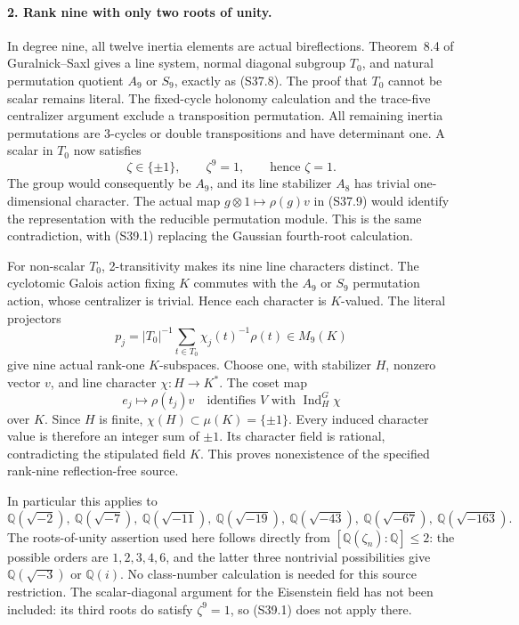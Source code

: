 \paragraph{2. Rank nine with only two roots of unity.}
In degree nine, all twelve inertia elements are actual
bireflections. Theorem~8.4 of Guralnick--Saxl gives a line system,
normal diagonal subgroup \(T_0\), and natural permutation
quotient \(A_9\) or \(S_9\), exactly as (S37.8).
The proof that \(T_0\) cannot be scalar remains literal.
The fixed-cycle holonomy calculation and the trace-five
centralizer argument exclude a transposition permutation.
All remaining inertia permutations are 3-cycles or double
transpositions and have determinant one. A scalar in \(T_0\)
now satisfies
\[
                    \zeta\in\{\pm1\},\qquad\zeta^9=1,
                    \qquad\text{hence }\zeta=1.             \tag{S39.1}
\]
The group would consequently be \(A_9\), and its line
stabilizer \(A_8\) has trivial one-dimensional character.
The actual map \(g\otimes1\mapsto\rho(g)v\) in (S37.9)
would identify the representation with the reducible permutation
module. This is the same contradiction, with (S39.1) replacing
the Gaussian fourth-root calculation.

For non-scalar \(T_0\), 2-transitivity makes its nine line
characters distinct. The cyclotomic Galois action fixing \(K\)
commutes with the \(A_9\) or \(S_9\) permutation action,
whose centralizer is trivial. Hence each character is \(K\)-valued.
The literal projectors
\[
       p_j=|T_0|^{-1}\sum_{t\in T_0}\chi_j(t)^{-1}\rho(t)
             \in M_9(K)                                    \tag{S39.2}
\]
give nine actual rank-one \(K\)-subspaces. Choose one, with
stabilizer \(H\), nonzero vector \(v\), and line character
\(\chi:H\to K^*\). The coset map
\[
       e_j\longmapsto\rho(t_j)v
       \quad\text{identifies }V\text{ with }
       \operatorname{Ind}_H^G\chi                            \tag{S39.3}
\]
over \(K\). Since \(H\) is finite,
\(\chi(H)\subset\mu(K)=\{\pm1\}\).
Every induced character value is therefore an integer sum of
\(\pm1\). Its character field is rational, contradicting
the stipulated field \(K\). This proves nonexistence of the
specified rank-nine reflection-free source.

In particular this applies to
\[
 \mathbb Q(\sqrt{-2}),\ \mathbb Q(\sqrt{-7}),\
 \mathbb Q(\sqrt{-11}),\ \mathbb Q(\sqrt{-19}),\
 \mathbb Q(\sqrt{-43}),\ \mathbb Q(\sqrt{-67}),\
 \mathbb Q(\sqrt{-163}).                                   \tag{S39.4}
\]
The roots-of-unity assertion used here follows directly from
\([\mathbb Q(\zeta_n):\mathbb Q]\le2\): the possible
orders are \(1,2,3,4,6\), and the latter three nontrivial
possibilities give \(\mathbb Q(\sqrt{-3})\) or
\(\mathbb Q(i)\). No class-number calculation is needed
for this source restriction. The scalar-diagonal argument for
the Eisenstein field has not been included: its third roots
do satisfy \(\zeta^9=1\), so (S39.1) does not apply there.


